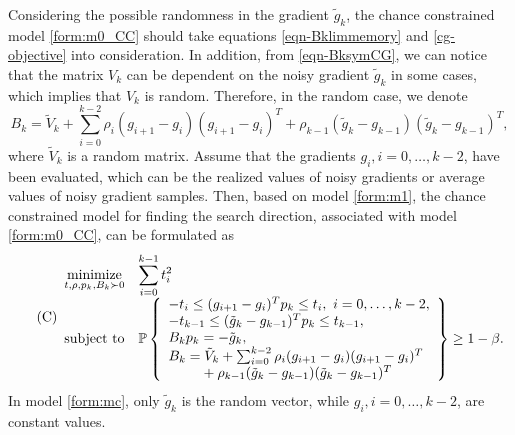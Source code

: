 \documentclass[11pt,twoside]{article}
\def\AFcomment#1{{\color{red}\emph{AF: #1}}}
\begin{document}
Considering the possible randomness in the gradient $\tilde{g}_k$, the chance constrained model \eqref{form:m0_CC} should take equations \eqref{eqn-Bklimmemory} and \eqref{cg-objective} into consideration.
In addition, from \eqref{eqn-BksymCG}, we can notice that the matrix $V_k$ can be dependent on the noisy gradient $\tilde{g}_k$ in some cases, which implies that $V_k$ is random.
Therefore, in the random case, we denote
\begin{equation}\label{eqn-Bklimmemory_Random}
B_k = \tilde{V}_k +  \sum_{i=0}^{k-2} \rho_{i} (g_{i+1}-g_i)(g_{i+1}-g_i)^T
 +\rho_{k-1} (\tilde{g}_k-g_{k-1})(\tilde{g}_k-g_{k-1})^T,
\end{equation}
where $\tilde{V}_k$ is a random matrix.  Assume that the gradients
$g_i, i=0,\dots, k-2$, have been evaluated, which can be the realized
values of noisy gradients or average values of noisy gradient samples.
Then, based on model \eqref{form:m1}, the chance constrained model for
finding the search direction, associated with model
\eqref{form:m0_CC}, can be formulated as
\begin{equation}\label{form:mc} \tag{C}
\begin{array}{lll}
\minimize{t,\rho, p_k, B_k \succ 0} & \disp\sum_{i=0}^{k-1}t_i^2   \\
\subject & \mathbb{P}\left\{
\begin{array}{l}
  -t_i \leq (g_{i+1}- g_i)^T p_k \leq t_i, \ i = 0,\dots,k-2, \\
  -t_{k-1} \leq (\tilde{g}_k- g_{k-1})^T p_k \leq t_{k-1},\\
   B_k p_k = -\tilde{g}_k, \\
B_k = \tilde{V}_k +  \sum_{i=0}^{k-2} \rho_{i} (g_{i+1}-g_i)(g_{i+1}-g_i)^T \\
\phantom{B_k =}
 +\rho_{k-1} (\tilde{g}_k-g_{k-1})(\tilde{g}_k-g_{k-1})^T
\end{array}
\right\} \geq 1-\beta.%
\end{array}
\end{equation}
In model \eqref{form:mc}, only $\tilde{g}_k$ is the random vector, while $g_i, i=0,\dots, k-2$, are constant values.
\end{document}
